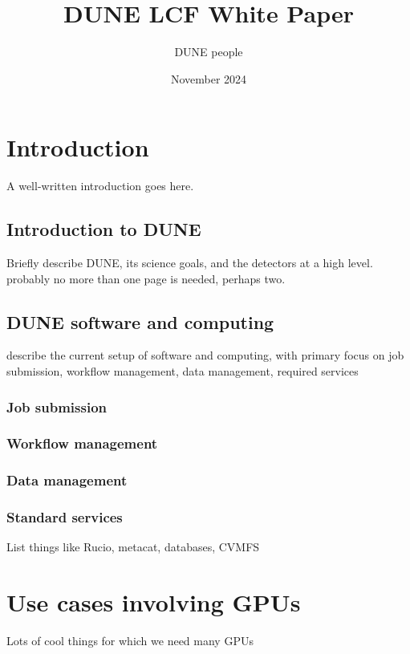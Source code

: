 \documentclass{article}
\title{DUNE LCF White Paper}
\author{DUNE people}
\date{November 2024}
\begin{document}

\maketitle
{}

\section{Introduction\label{sec:intro}}
A well-written introduction goes here.
\subsection{Introduction to DUNE\label{sub:duneintro}}
Briefly describe DUNE, its science goals, and the detectors at a high level. probably no more than one page is needed, perhaps two.
\subsection{DUNE software and computing \label{sub:dunesw}}
describe the current setup of software and computing, with primary focus on job submission, workflow management, data management, required services
\subsubsection{Job submission\label{sub:jobsub}}

\subsubsection{Workflow management\label{sub:workflow}}

\subsubsection{Data management\label{sub:dm}}

\subsubsection{Standard services\label{sub:services}}
List things like Rucio, metacat, databases, CVMFS


\section{Use cases involving GPUs\label{sec:gpu}}
Lots of cool things for which we need many GPUs
\end{document}
